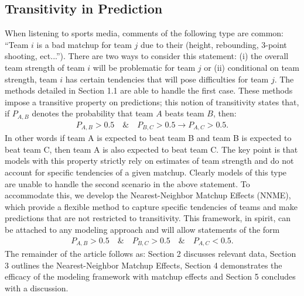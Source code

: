\documentclass[letterpaper,12pt]{article}
\begin{document}
\subsection{Transitivity in Prediction}
When listening to sports media, comments of the following type are common: ``Team $i$ is a bad matchup for team $j$ due to their (height, rebounding, 3-point shooting, ect...''). There are two ways to consider this statement: (i) the overall team strength of team $i$ will be problematic for team $j$ or (ii) conditional on team strength, team $i$ has certain tendencies that will pose difficulties for team $j$. The methods detailed in Section 1.1 are able to handle the first case. These methods impose a transitive property on predictions; this notion of transitivity states that, if $P_{A,B}$ denotes the probability that team $A$ beats team $B$, then: 
\begin{eqnarray}
P_{A,B} > 0.5 \quad \& \quad P_{B,C} > 0.5 \rightarrow P_{A,C} > 0.5.
\label{eq:trans}
\end{eqnarray}
In other words if team A is expected to beat team B and team B is expected to beat team C, then team A is also expected to beat team C. The key point is that models with this property strictly rely on estimates of team strength and do not account for specific tendencies of a given matchup. Clearly models of this type are unable to handle the second scenario in the above statement. To accommodate this, we develop the Nearest-Neighbor Matchup Effects (NNME), which provide a flexible method to capture specific tendencies of teams and make predictions that are not restricted to transitivity. This framework, in spirit, can be attached to any modeling approach and will allow statements of the form
\begin{eqnarray*}
P_{A,B} > 0.5 \quad \& \quad P_{B,C} > 0.5 \quad \& \quad P_{A,C} < 0.5.
\label{eq:trans}
\end{eqnarray*}
The remainder of the article follows as: Section 2 discusses relevant data, Section 3 outlines the Nearest-Neighbor Matchup Effects, Section 4 demonstrates the efficacy of the modeling framework with matchup effects and Section 5 concludes with a discussion.
\end{document}
